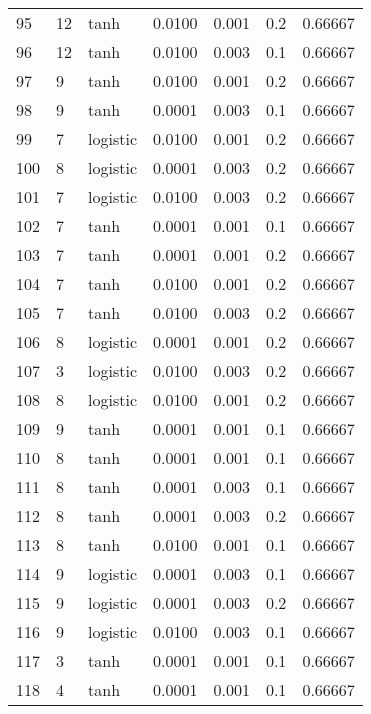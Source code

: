 \begin{tabular}{lllrrrr}
95  &          12 &      tanh &  0.0100 &  0.001 &  0.2 &   0.66667 \\
96  &          12 &      tanh &  0.0100 &  0.003 &  0.1 &   0.66667 \\
97  &           9 &      tanh &  0.0100 &  0.001 &  0.2 &   0.66667 \\
98  &           9 &      tanh &  0.0001 &  0.003 &  0.1 &   0.66667 \\
99  &           7 &  logistic &  0.0100 &  0.001 &  0.2 &   0.66667 \\
100 &           8 &  logistic &  0.0001 &  0.003 &  0.2 &   0.66667 \\
101 &           7 &  logistic &  0.0100 &  0.003 &  0.2 &   0.66667 \\
102 &           7 &      tanh &  0.0001 &  0.001 &  0.1 &   0.66667 \\
103 &           7 &      tanh &  0.0001 &  0.001 &  0.2 &   0.66667 \\
104 &           7 &      tanh &  0.0100 &  0.001 &  0.2 &   0.66667 \\
105 &           7 &      tanh &  0.0100 &  0.003 &  0.2 &   0.66667 \\
106 &           8 &  logistic &  0.0001 &  0.001 &  0.2 &   0.66667 \\
107 &           3 &  logistic &  0.0100 &  0.003 &  0.2 &   0.66667 \\
108 &           8 &  logistic &  0.0100 &  0.001 &  0.2 &   0.66667 \\
109 &           9 &      tanh &  0.0001 &  0.001 &  0.1 &   0.66667 \\
110 &           8 &      tanh &  0.0001 &  0.001 &  0.1 &   0.66667 \\
111 &           8 &      tanh &  0.0001 &  0.003 &  0.1 &   0.66667 \\
112 &           8 &      tanh &  0.0001 &  0.003 &  0.2 &   0.66667 \\
113 &           8 &      tanh &  0.0100 &  0.001 &  0.1 &   0.66667 \\
114 &           9 &  logistic &  0.0001 &  0.003 &  0.1 &   0.66667 \\
115 &           9 &  logistic &  0.0001 &  0.003 &  0.2 &   0.66667 \\
116 &           9 &  logistic &  0.0100 &  0.003 &  0.1 &   0.66667 \\
117 &           3 &      tanh &  0.0001 &  0.001 &  0.1 &   0.66667 \\
118 &           4 &      tanh &  0.0001 &  0.001 &  0.1 &   0.66667 \\

\end{tabular}

